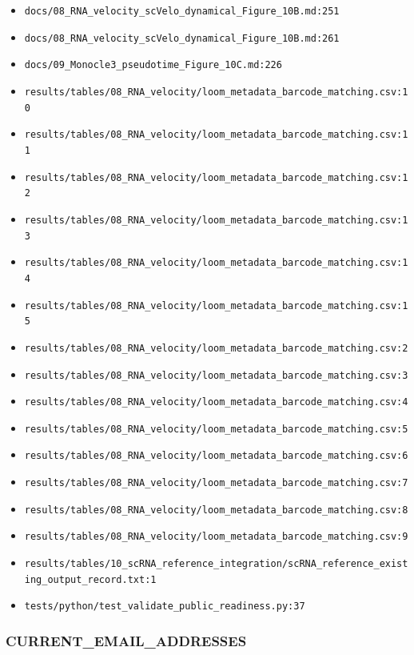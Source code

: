 \documentclass[
]{article}
\providecommand{\tightlist}{%
  \setlength{\itemsep}{0pt}\setlength{\parskip}{0pt}}
\begin{document}
\begin{itemize}
\tightlist
\item
  \texttt{docs/08\_RNA\_velocity\_scVelo\_dynamical\_Figure\_10B.md:251}
\item
  \texttt{docs/08\_RNA\_velocity\_scVelo\_dynamical\_Figure\_10B.md:261}
\item
  \texttt{docs/09\_Monocle3\_pseudotime\_Figure\_10C.md:226}
\item
  \texttt{results/tables/08\_RNA\_velocity/loom\_metadata\_barcode\_matching.csv:10}
\item
  \texttt{results/tables/08\_RNA\_velocity/loom\_metadata\_barcode\_matching.csv:11}
\item
  \texttt{results/tables/08\_RNA\_velocity/loom\_metadata\_barcode\_matching.csv:12}
\item
  \texttt{results/tables/08\_RNA\_velocity/loom\_metadata\_barcode\_matching.csv:13}
\item
  \texttt{results/tables/08\_RNA\_velocity/loom\_metadata\_barcode\_matching.csv:14}
\item
  \texttt{results/tables/08\_RNA\_velocity/loom\_metadata\_barcode\_matching.csv:15}
\item
  \texttt{results/tables/08\_RNA\_velocity/loom\_metadata\_barcode\_matching.csv:2}
\item
  \texttt{results/tables/08\_RNA\_velocity/loom\_metadata\_barcode\_matching.csv:3}
\item
  \texttt{results/tables/08\_RNA\_velocity/loom\_metadata\_barcode\_matching.csv:4}
\item
  \texttt{results/tables/08\_RNA\_velocity/loom\_metadata\_barcode\_matching.csv:5}
\item
  \texttt{results/tables/08\_RNA\_velocity/loom\_metadata\_barcode\_matching.csv:6}
\item
  \texttt{results/tables/08\_RNA\_velocity/loom\_metadata\_barcode\_matching.csv:7}
\item
  \texttt{results/tables/08\_RNA\_velocity/loom\_metadata\_barcode\_matching.csv:8}
\item
  \texttt{results/tables/08\_RNA\_velocity/loom\_metadata\_barcode\_matching.csv:9}
\item
  \texttt{results/tables/10\_scRNA\_reference\_integration/scRNA\_reference\_existing\_output\_record.txt:1}
\item
  \texttt{tests/python/test\_validate\_public\_readiness.py:37}
\end{itemize}

\subsubsection{CURRENT\_EMAIL\_ADDRESSES}\label{current_email_addresses}
\end{document}
